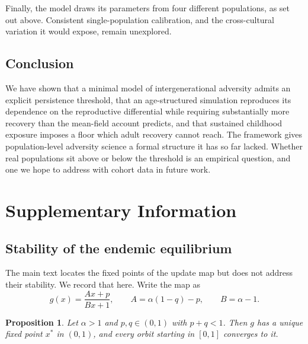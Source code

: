 \documentclass{article}
\newtheorem{proposition}{Proposition}
\begin{document}
Finally, the model draws its parameters from four different populations, as set
out above.  Consistent single-population calibration, and the cross-cultural
variation it would expose, remain unexplored.

\subsection*{Conclusion}

We have shown that a minimal model of intergenerational adversity admits an
explicit persistence threshold, that an age-structured simulation reproduces
its dependence on the reproductive differential while requiring substantially
more recovery than the mean-field account predicts, and that sustained
childhood exposure imposes a floor which adult recovery cannot reach.  The
framework gives population-level adversity science a formal structure it has so
far lacked.  Whether real populations sit above or below the threshold is an
empirical question, and one we hope to address with cohort data in future work.




\newpage
\appendix
\section*{Supplementary Information}

\subsection{Stability of the endemic equilibrium}
\label{si:stability}

The main text locates the fixed points of the update map but does not address
their stability.  We record that here.  Write the map as
\[
    g(x)=\frac{Ax+p}{Bx+1},
    \qquad
    A=\alpha(1-q)-p,
    \qquad
    B=\alpha-1 .
\]

\begin{proposition}
\label{prop:stability}
Let \(\alpha>1\) and \(p,q\in(0,1)\) with \(p+q<1\).  Then \(g\) has a unique
fixed point \(x^*\) in \((0,1)\), and every orbit starting in \([0,1]\)
converges to it.
\end{proposition}
\end{document}

